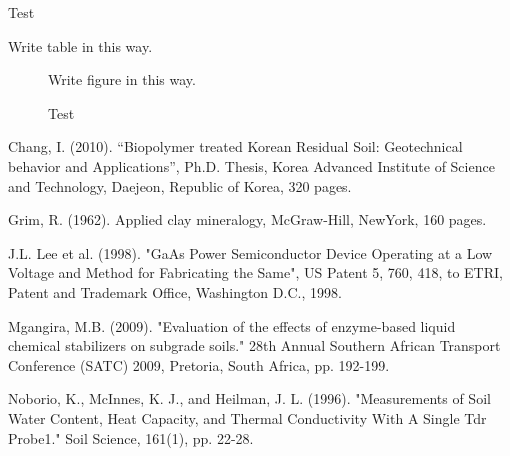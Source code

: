 \documentclass{thesis-SJ-two}
\begin{document}
	\begin{table}
		\caption{Test}
		Write table in this way. 
	\end{table}
	
	
	\begin{figure}
		Write figure in this way. 
		\caption{Test}
	\end{figure}
	
	
\begin{thebibliography}{10}
	Chang, I. (2010). “Biopolymer treated Korean Residual Soil: Geotechnical behavior and Applications”,  Ph.D. Thesis, Korea Advanced Institute of Science and Technology, Daejeon, Republic of Korea, 320 pages.
	
	Grim, R. (1962). Applied clay mineralogy, McGraw-Hill, NewYork, 160 pages.
	
	J.L. Lee et al. (1998). "GaAs Power Semiconductor Device Operating at a Low Voltage and Method for Fabricating the Same", US Patent 5, 760, 418, to ETRI, Patent and Trademark Office, Washington D.C., 1998.
	
	Mgangira, M.B. (2009). "Evaluation of the effects of enzyme-based liquid chemical stabilizers on subgrade soils." 28th Annual Southern African Transport Conference (SATC) 2009, Pretoria, South Africa, pp. 192-199.
	
	Noborio, K., McInnes, K. J., and Heilman, J. L. (1996). "Measurements of Soil Water Content, Heat Capacity, and Thermal Conductivity With A Single Tdr Probe1."  Soil Science, 161(1), pp. 22-28.
	
\end{thebibliography}
	
\end{document}
